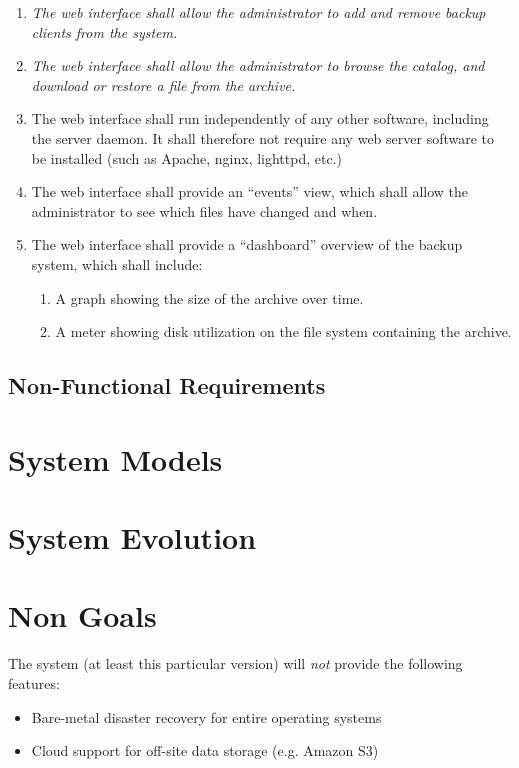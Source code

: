 \begin{enumerate}
        \begin{enumerate}
            \item \emph{The web interface shall allow the administrator to add
                and remove backup clients from the system.}
            \item \emph{The web interface shall allow the administrator to
                browse the catalog, and download or restore a file from the
                archive.}
            \item The web interface shall run independently of any other
                software, including the server daemon. It shall therefore not
                require any web server software to be installed (such as
                Apache, nginx, lighttpd, etc.)
            \item The web interface shall provide an ``events'' view, which
                shall allow the administrator to see which files have changed
                and when.
            \item The web interface shall provide a ``dashboard'' overview of
                the backup system, which shall include:
                \begin{enumerate}
                    \item A graph showing the size of the archive over time.
                    \item A meter showing disk utilization on the file system
                        containing the archive.
                \end{enumerate}
        \end{enumerate}
\end{enumerate}

\subsection{Non-Functional Requirements}

\section{System Models}

\section{System Evolution}

\section{Non Goals}

The system (at least this particular version) will \emph{not} provide the
following features:

\begin{itemize}
    \item Bare-metal disaster recovery for entire operating systems
    \item Cloud support for off-site data storage (e.g. Amazon S3)
\end{itemize}
